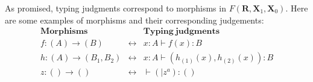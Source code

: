 \documentclass[pra,floatfix,
amsmath,superscriptaddress, 12pt]{article}
\theoremstyle{definition}
\begin{document}
As promised, typing judgments correspond to morphisms in $F(\mathbf{R},\mathbf{X}_1,\mathbf{X}_0)$. Here are some examples of morphisms and their corresponding judgements:
%
\begin{eqnarray*}
    \mathbf{Morphisms}
        &
          &
          \mathbf{Typing \ judgments} \\
    f:(A) \longrightarrow (B)
        &
        \longleftrightarrow
            &  x:A\vdash f\left(x\right):B
                \\
    h:(A)\longrightarrow\left(B_{1},B_{2}\right)
        &
        \longleftrightarrow
            &
            x:A\vdash\left(h_{\left(1\right)}\left(x\right),h_{\left(2\right)}\left(x\right)\right):B
                \\
    z:() \longrightarrow ()
        &
        \longleftrightarrow
            &
            \vdash\left(|z^{a}\right):\left(\right)
\end{eqnarray*}
\end{document}
